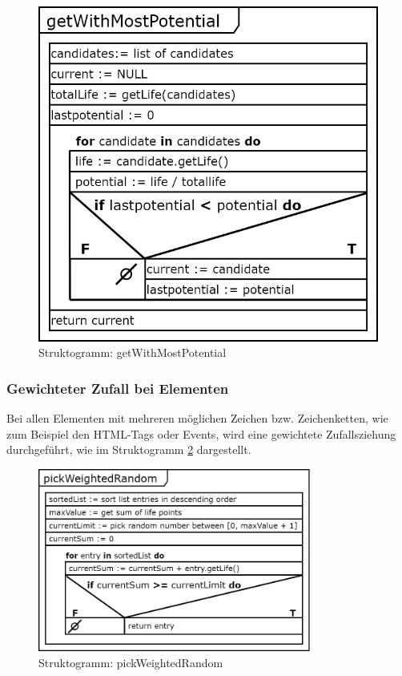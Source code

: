 \begin{figure}[htbp] 
	\centering
	\includegraphics[width=.62\textwidth]{contents/images/StructoGetWithMostPotential}
	\caption{Struktogramm: getWithMostPotential}
	\label{fig:StructoGetWithMostPotential}
\end{figure}

\subsubsection{Gewichteter Zufall bei Elementen}\label{ssec:weightedRandom}

Bei allen Elementen mit mehreren möglichen Zeichen bzw. Zeichenketten, wie zum Beispiel den HTML-Tags oder Events, wird eine gewichtete Zufallsziehung durchgeführt, wie im Struktogramm \ref{fig:StructoPickWeightedRandom} dargestellt.

\begin{figure}[htbp] 
	\centering
	\includegraphics[width=0.80\textwidth]{contents/images/StructoPickWeightedRandom}
	\caption{Struktogramm: pickWeightedRandom}
	\label{fig:StructoPickWeightedRandom}
\end{figure}

